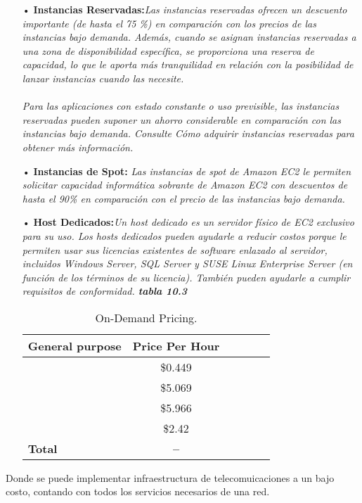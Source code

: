 \begin{itemize}
\item[•] \textbf{Instancias Reservadas:}\textit{Las instancias reservadas ofrecen un descuento importante (de hasta el 75 \%) en comparación con los precios de las instancias bajo demanda. Además, cuando se asignan instancias reservadas a una zona de disponibilidad específica, se proporciona una reserva de capacidad, lo que le aporta más tranquilidad en relación con la posibilidad de lanzar instancias cuando las necesite.
\\
\\
Para las aplicaciones con estado constante o uso previsible, las instancias reservadas pueden suponer un ahorro considerable en comparación con las instancias bajo demanda. Consulte Cómo adquirir instancias reservadas para obtener más información.}
\item[•] \textbf{Instancias de Spot:} \textit{Las instancias de spot de Amazon EC2 le permiten solicitar capacidad informática sobrante de Amazon EC2 con descuentos de hasta el 90\% en comparación con el precio de las instancias bajo demanda.}
\item[•] \textbf{Host Dedicados:}\textit{Un host dedicado es un servidor físico de EC2 exclusivo para su uso. Los hosts dedicados pueden ayudarle a reducir costos porque le permiten usar sus licencias existentes de software enlazado al servidor, incluidos Windows Server, SQL Server y SUSE Linux Enterprise Server (en función de los términos de su licencia). También pueden ayudarle a cumplir requisitos de conformidad. \textbf{tabla 10.3}}


\begin{table}[ht]
	\caption{On-Demand Pricing.}
	\label{tab:hla:results}
\centering
\begin{tabular}{lccccc}
	\toprule
	\multicolumn{1}{c}{\textbf{General purpose}} 	& \textbf{Price Per Hour}\\
	\midrule
\cite{a1} 		& \$0.449\\
\cite{m5} 		& \$5.069\\
\cite{m5d}		& \$5.966\\
\cite{m4} 		& \$2.42\\

	\midrule
	\textbf{Total}			& \textbf{--}	\\
	\bottomrule
\end{tabular}
\end{table}


\end{itemize}

Donde se puede implementar infraestructura de telecomuicaciones a un bajo costo, contando con todos los servicios necesarios de una red.
